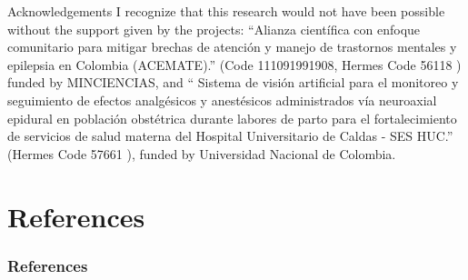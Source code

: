 \documentclass[aspectratio=169]{beamer}
\begin{document}
\begin{frame}{Acknowledgements}
    \centering
    I recognize that this research would not have been possible without the support given by the projects: “Alianza científica con enfoque comunitario para mitigar brechas de atención y manejo de trastornos mentales y epilepsia en Colombia (ACEMATE).” (Code 111091991908, Hermes Code 56118 ) funded by MINCIENCIAS, and “ Sistema de visión artificial para el monitoreo y seguimiento de efectos analgésicos y anestésicos administrados vía neuroaxial epidural en población obstétrica durante labores de parto para el fortalecimiento de servicios de salud materna del Hospital Universitario de Caldas - SES HUC.” (Hermes Code 57661 ), funded by Universidad Nacional de Colombia.
\end{frame}

\section{References}
\begin{frame}[allowframebreaks]%
\frametitle{References}
{\tiny 


}
\end{frame}
\end{document}

